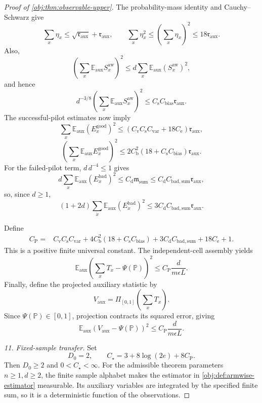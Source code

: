 \documentclass[11pt]{article}
\begin{document}
\begin{proof}[Proof of \cref{obj:thm:observable-upper}]
The probability-mass identity and Cauchy--Schwarz give
\[
\sum_x\eta_x\le\sqrt{\mathfrak r_{\mathrm{aux}}}+\mathfrak r_{\mathrm{aux}},
\qquad
\sum_x\eta_x^2\le\left(\sum_x\eta_x\right)^2
\le18\mathfrak r_{\mathrm{aux}}.
\]
Also,
\[
\left(\sum_x\mathbb E_{\mathrm{aux}}S_x^{\mathrm{aw}}\right)^2
\le d\sum_x\mathbb E_{\mathrm{aux}}(S_x^{\mathrm{aw}})^2,
\]
and hence
\[
d^{-3/8}
\left(\sum_x\mathbb E_{\mathrm{aux}}S_x^{\mathrm{aw}}\right)^2
\le C_{\mathrm s}C_{\mathrm{bias}}\mathfrak r_{\mathrm{aux}}.
\]
The successful-pilot estimates now imply
\[
\sum_x\mathbb E_{\mathrm{aux}}(E_x^{\mathrm{good}})^2
\le
(C_{\mathrm v}C_{\mathrm s}C_{\mathrm{var}}+18C_{\mathrm e})
\mathfrak r_{\mathrm{aux}},
\]
\[
\left(\sum_x\mathbb E_{\mathrm{aux}}E_x^{\mathrm{good}}\right)^2
\le
2C_{\mathrm b}^2(18+C_{\mathrm s}C_{\mathrm{bias}})
\mathfrak r_{\mathrm{aux}}.
\]
For the failed-pilot term, \(d\,d^{-4}\le1\) gives
\[
d\sum_x\mathbb E_{\mathrm{aux}}(E_x^{\mathrm{bad}})^2
\le C_{\mathrm d}\mathfrak m_{\mathrm{sum}}
\le C_{\mathrm d}C_{\mathrm{bad,sum}}\mathfrak r_{\mathrm{aux}},
\]
so, since \(d\ge1\),
\[
(1+2d)\sum_x\mathbb E_{\mathrm{aux}}(E_x^{\mathrm{bad}})^2
\le3C_{\mathrm d}C_{\mathrm{bad,sum}}\mathfrak r_{\mathrm{aux}}.
\]

Define
\[
\begin{aligned}
C_{\mathrm P}={}&
C_{\mathrm v}C_{\mathrm s}C_{\mathrm{var}}
+4C_{\mathrm b}^2(18+C_{\mathrm s}C_{\mathrm{bias}})
+3C_{\mathrm d}C_{\mathrm{bad,sum}}
+18C_{\mathrm e}+1.
\end{aligned}
\]
This is a positive finite universal constant. The independent-cell assembly yields
\[
\mathbb E_{\mathrm{aux}}
\left(\sum_xT_x-\Psi(\mathbb P)\right)^2
\le C_{\mathrm P}\frac{d}{m\epsilon L}.
\]
Finally, define the projected auxiliary statistic by
\[
V_{\mathrm{aux}}=\Pi_{[0,1]}\left(\sum_xT_x\right).
\]
Since \(\Psi(\mathbb P)\in[0,1]\), projection contracts its squared error, giving
\[
\mathbb E_{\mathrm{aux}}
(V_{\mathrm{aux}}-\Psi(\mathbb P))^2
\le C_{\mathrm P}\frac{d}{m\epsilon L}.
\]

\textit{11. Fixed-sample transfer.}
Set
\[
D_0=2,\qquad
C_\star=3+8\log(2e)+8C_{\mathrm P}.
\]
Then \(D_0\ge2\) and \(0<C_\star<\infty\). For the admissible theorem parameters \(n\ge1,d\ge2\), the finite sample alphabet makes the estimator in \cref{obj:def:armwise-estimator} measurable. Its auxiliary variables are integrated by the specified finite sum, so it is a deterministic function of the observations.


\end{proof}
\end{document}
